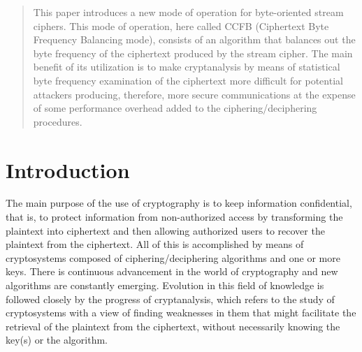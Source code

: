 \documentclass[conference]{IEEEtran}
\begin{document}
\begin{abstract}
This paper introduces a new mode of operation for byte-oriented stream ciphers. This mode of operation, here called CCFB (Ciphertext Byte Frequency Balancing mode), consists of an algorithm that balances out the byte frequency of the ciphertext produced by the stream cipher. The main benefit of its utilization is to make cryptanalysis by means of statistical byte frequency examination of the ciphertext more difficult for potential attackers producing, therefore, more secure communications at the expense of some performance overhead added to the ciphering/deciphering procedures.
\end{abstract}





%
\IEEEpeerreviewmaketitle



\section{Introduction}

The main purpose of the use of cryptography is to keep information confidential, that is, to protect information from non-authorized access by transforming the plaintext into ciphertext and then allowing authorized users to recover the plaintext from the ciphertext. All of this is accomplished by means of cryptosystems composed of ciphering/deciphering algorithms and one or more keys. There is continuous advancement in the world of cryptography and new algorithms are constantly emerging. Evolution in this field of knowledge is followed closely by the progress of cryptanalysis, which refers to the study of cryptosystems with a view of finding weaknesses in them that might facilitate the retrieval of the plaintext from the ciphertext, without necessarily knowing the key(s) or the algorithm.
\end{document}
